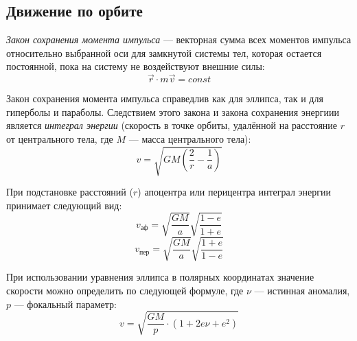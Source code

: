 \subsection{Движение по орбите}

\textit{Закон сохранения момента импульса} ---  векторная сумма всех моментов 
импульса относительно выбранной оси для замкнутой системы тел, которая остается 
постоянной, пока на систему не воздействуют внешние силы:
\begin{equation}
\vec{r} \cdot m\vec{v}=const  
\end{equation}

Закон сохранения момента импульса справедлив как для эллипса, так и для 
гиперболы и параболы. Следствием этого закона и закона сохранения энергиии 
является        \textit{ интеграл энергии} (скорость в точке орбиты, удалённой 
на расстояние $r$ от центрального тела, где $M$ --- масса центрального тела):
\begin{equation}v=\sqrt{GM\left(\frac2r - \frac1a\right)}
\end{equation}

При подстановке расстояний ($r$) апоцентра или перицентра интеграл энергии 
принимает следующий вид:
\begin{equation}v_{\text{аф}}=\sqrt{\frac{GM}{a}} \sqrt{\frac{1-e}{1+e}}
\end{equation}
\begin{equation}v_{\text{пер}}=\sqrt{\frac{GM}{a}}\sqrt{\frac{1+e}{1-e}}
\end{equation}

При использовании уравнения эллипса в полярных координатах значение скорости 
можно определить по следующей формуле, где $\nu$ --- истинная аномалия, $p$ --- 
фокальный параметр:
\begin{equation}v=\sqrt{\frac{GM}{p}\cdot(1+2e\nu+e^2)}
\end{equation}

